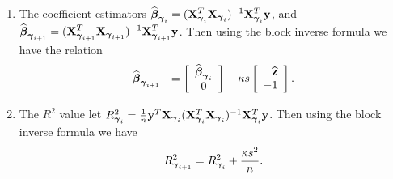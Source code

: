 \begin{enumerate}
	\item
	The coefficient estimators 
	$ 
	\displaystyle \widehat{{\boldsymbol \beta}}_{{\boldsymbol \gamma}_{i}} = ({\bf X}_{{\boldsymbol \gamma}_{i}}^T{\bf X}_{{\boldsymbol \gamma}_{i}})^{-1}{\bf X}_{{\boldsymbol \gamma}_{i}}^T{\bf y}$,
	and $\displaystyle \widehat{{\boldsymbol \beta}}_{{\boldsymbol \gamma}_{i+1}}  = ({\bf X}_{{\boldsymbol \gamma}_{i+1}}^T{\bf X}_{{\boldsymbol \gamma}_{i+1}})^{-1}{\bf X}_{{\boldsymbol \gamma}_{i+1}}^T{\bf y}$.  
	Then using the block inverse formula we have
	the relation
	$$
	\begin{array}{rl}
	\displaystyle \widehat{{\boldsymbol \beta}}_{{\boldsymbol \gamma}_{i+1}}
	& \displaystyle 
	= \left[ \begin{array}{c}
	\widehat{{\boldsymbol \beta}}_{{\boldsymbol \gamma}_{i}} \\
	0 
	\end{array} \right] - \kappa s  \left[ \begin{array}{r}
	\widehat{{\bf z}}   \\
	- 1
	\end{array} \right].
	\end{array} 
	$$
	
	\item The $R^2$ value let 
	$R_{\vgamma_{i}}^2 = \tfrac{1}{n} \vy^T\mX_{\vgamma_{i}}(\mX_{\vgamma_{i}}^T\mX_{\vgamma_{i}})^{-1}\mX_{\vgamma_{i}}^T\vy$.
	Then using the block inverse formula we have
	$$
	\begin{array}{rl}
	\ds 
	R_{\vgamma_{i+1}}^2 
	= R_{\vgamma_{i}}^2
	+ \frac{\kappa s^2}{n}.
	
	\end{array}
	$$
	
\end{enumerate}

